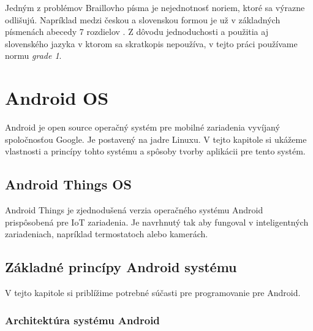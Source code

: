 \documentclass{template/socthesis}
\begin{document}
Jedným z problémov Braillovho písma je nejednotnosť noriem, ktoré sa výrazne odlišujú. Napríklad medzi českou a slovenskou formou je už v základných písmenách abecedy 7 rozdielov \cite{braille-wiki}. Z dôvodu jednoduchosti a použitia aj slovenského jazyka v ktorom sa skratkopis nepoužíva, v tejto práci používame normu \textit{grade 1}. 


\newpage
\chapter{Android OS}
Android je open source operačný systém pre mobilné zariadenia vyvíjaný spoločnosťou Google. Je postavený na jadre Linuxu. V tejto kapitole si ukážeme vlastnosti  a princípy tohto systému a spôsoby tvorby aplikácii pre tento systém.

\section{Android Things OS}
Android Things je zjednodušená verzia operačného systému Android prispôsobená pre IoT zariadenia. Je navrhnutý tak aby fungoval v inteligentných zariadeniach, napríklad termostatoch alebo kamerách.

\section{Základné princípy Android systému}
V tejto kapitole si priblížime potrebné súčasti pre programovanie pre Android.

\subsection*{Architektúra systému Android}
\end{document}
